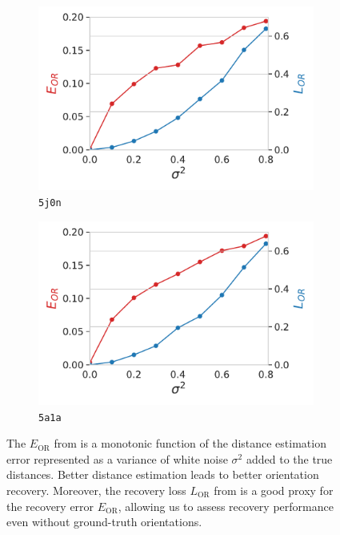 \begin{figure}
    \centering
    \begin{subfigure}[b]{0.49\linewidth}
        \includegraphics[width=\linewidth]{figures/5j0n_perfect_noisy_ar_aa}
        \caption{\texttt{5j0n}}
    \end{subfigure}
    \begin{subfigure}[b]{0.49\linewidth}
    \centering
        \includegraphics[width=\linewidth]{figures/5a1a_perfect_noisy_ar_aa}
        \caption{\texttt{5a1a}}
    \end{subfigure}
    \caption{
        The $E_\text{OR}$ from  is a monotonic function of the distance estimation error represented as a variance of white noise $\sigma^2$ added to the true distances.
        Better distance estimation leads to better orientation recovery.
        Moreover, the recovery loss $L_\text{OR}$ from  is a good proxy for the recovery error $E_\text{OR}$, allowing us to assess recovery performance even without ground-truth orientations.
    }\label{fig:perfect-with-noise-ar-aa}



\end{figure}
